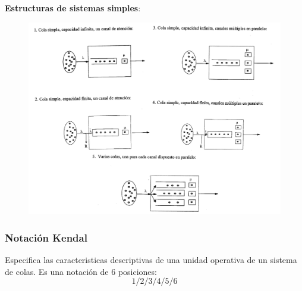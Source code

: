 \documentclass{article}
\begin{document}
\newpage
\textbf{Estructuras de sistemas simples}:
\begin{figure}[h!]
    \includegraphics[width=\linewidth]{imagenes/estructuras_simples.png}
\end{figure}

\newpage
\subsubsection{Notación Kendal}
Especifica las caracteristicas descriptivas de una unidad operativa de un sistema de colas. Es una notación de 6 posiciones:
\begin{equation}
    1 / 2 / 3 / 4 / 5 / 6    
\end{equation}
\end{document}
